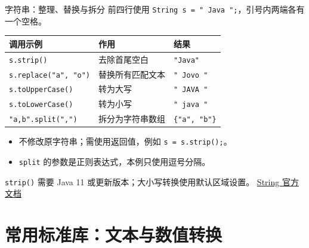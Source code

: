 \documentclass[aspectratio=169]{beamer}
\begin{document}
\begin{frame}[fragile]{字符串：整理、替换与拆分}
  前四行使用 \texttt{String s = " Java ";}，引号内两端各有一个空格。
  \begin{center}
    \renewcommand{\arraystretch}{1.4}
    \begin{tabular}{lll}
      \textbf{调用示例} & \textbf{作用} & \textbf{结果} \\
      \hline
      \texttt{s.strip()} & 去除首尾空白 & \texttt{"Java"} \\
      \texttt{s.replace("a", "o")} & 替换所有匹配文本 & \texttt{" Jovo "} \\
      \texttt{s.toUpperCase()} & 转为大写 & \texttt{" JAVA "} \\
      \texttt{s.toLowerCase()} & 转为小写 & \texttt{" java "} \\
      \texttt{"a,b".split(",")} & 拆分为字符串数组 & \texttt{\{"a", "b"\}} \\
    \end{tabular}
  \end{center}
  \medskip
  \begin{itemize}
    \item 不修改原字符串；需使用返回值，例如 \texttt{s = s.strip();}。
    \item \texttt{split} 的参数是正则表达式，本例只使用逗号分隔。
  \end{itemize}
  \medskip
  {\footnotesize\texttt{strip()} 需要 Java 11 或更新版本；大小写转换使用默认区域设置。
  \href{https://docs.oracle.com/en/java/javase/25/docs/api/java.base/java/lang/String.html}{String 官方文档}}
\end{frame}

\section{常用标准库：文本与数值转换}
\end{document}
